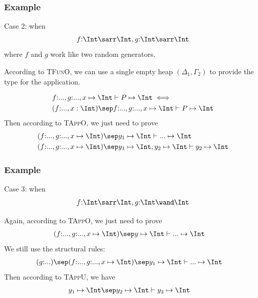 \begin{frame}[fragile]
    \frametitle{Example}
    
    Case 2: when
    \begin{align*}
        f{:}\Int \sarr \Int, g{:}\Int \sarr \Int
    \end{align*}
    where $f$ and $g$ work like two random generators.

    According to \textsc{TFunO}, we can use a single empty heap $(\Delta_1, \Gamma_2)$ to provide the type for the application.

    \begin{align*}
        &f{:}..., g{:}..., x \mapsto \Int \vdash P \mapsto \Int \iff 
        \\&(f{:}..., x: \Int) \sep f{:}..., g{:}..., x \mapsto \Int \vdash P \mapsto \Int
    \end{align*}
    Then according to \textsc{TAppO}, we just need to prove
    \begin{align*}
        &(f{:}..., g{:}..., x \mapsto \Int) \sep y_1\mapsto\Int \vdash ... \mapsto \Int
        \\&(f{:}..., g{:}..., x \mapsto \Int) \sep y_1\mapsto\Int, y_2\mapsto\Int \vdash y_2 \mapsto \Int
    \end{align*}
\end{frame}

\begin{frame}[fragile]
    \frametitle{Example}
    
    Case 3: when
    \begin{align*}
        f{:}\Int \sarr \Int, g{:}\Int \wand \Int
    \end{align*}

    Again, according to \textsc{TAppO}, we just need to prove
    \begin{align*}
        &(f{:}..., g{:}..., x \mapsto \Int) \sep y\mapsto\Int \vdash ... \mapsto \Int
    \end{align*}
    We still use the structural rules:
    \begin{align*}
        &(g{:}...) \sep (f{:}..., g{:}..., x \mapsto \Int) \sep y_1\mapsto\Int \vdash ... \mapsto \Int
    \end{align*}
    Then according to \textsc{TAppU}, we have
    \begin{align*}
        &y_1\mapsto\Int \sep y_2 \mapsto \Int \vdash y_2 \mapsto \Int
    \end{align*}
\end{frame}

